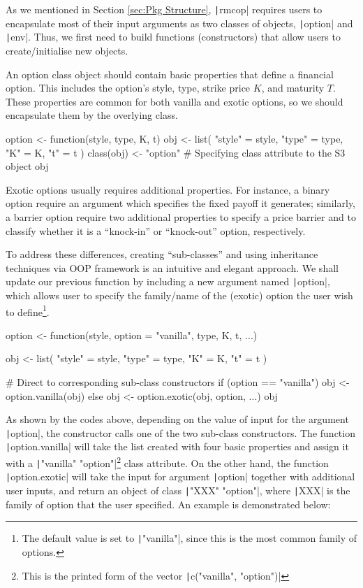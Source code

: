 As we mentioned in Section \ref{sec:Pkg Structure}, \texttt|rmcop| requires users to encapsulate most of their input arguments as two classes of objects, \texttt|option| and \texttt|env|. Thus, we first need to build functions (constructors) that allow users to create/initialise new objects.

An option class object should contain basic properties that define a financial option. This includes the option's style, type, strike price $K$, and maturity $T$. These properties are common for both vanilla and exotic options, so we should encapsulate them by the overlying class.

\begin{Rminted}
option <- function(style, type, K, t) {
    obj <- list(
        "style" = style,
        "type" = type,
        "K" = K,
        "t" = t
    )
    class(obj) <- "option" # Specifying class attribute to the S3 object
    obj
}
\end{Rminted}

Exotic options usually requires additional properties. For instance, a binary option require an argument which specifies the fixed payoff it generates; similarly, a barrier option require two additional properties to specify a price barrier and to classify whether it is a ``knock-in'' or ``knock-out'' option, respectively.

To address these differences, creating ``sub-classes'' and using inheritance techniques via OOP framework is an intuitive and elegant approach. We shall update our previous function by including a new argument named \texttt|option|, which allows user to specify the family/name of the (exotic) option the user wish to define\footnote{The default value is set to \texttt|"vanilla"|, since this is the most common family of options.}.

\begin{Rminted}
option <- function(style, option = "vanilla", type, K, t, ...) {

    obj <- list(
        "style" = style,
        "type" = type,
        "K" = K,
        "t" = t
    )

    # Direct to corresponding sub-class constructors
    if (option == "vanilla") {
        obj <- option.vanilla(obj)
    } else {
        obj <- option.exotic(obj, option, ...)
    }
    obj
}
\end{Rminted}

As shown by the codes above, depending on the value of input for the argument \texttt|option|, the constructor calls one of the two sub-class constructors. The function \texttt|option.vanilla| will take the list created with four basic properties and assign it with a \texttt|"vanilla" "option"|\footnote{This is the printed form of the vector \texttt|c("vanilla", "option")|} class attribute. On the other hand, the function \texttt|option.exotic| will take the input for argument \texttt|option| together with additional user inputs, and return an object of class \texttt|"XXX" "option"|, where \texttt|XXX| is the family of option that the user specified. An example is demonstrated below:

